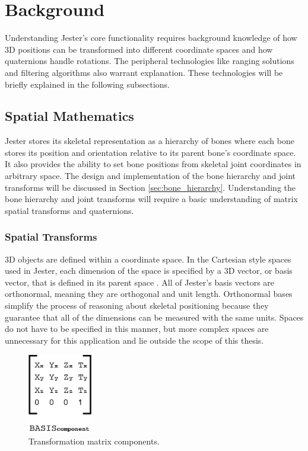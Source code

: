 \chapter{Background}

Understanding Jester's core functionality requires background knowledge of how 3D positions can be transformed into different coordinate spaces and how quaternions handle rotations. The peripheral technologies like ranging solutions and filtering algorithms also warrant explanation. These technologies will be briefly explained in the following subsections.

\section{Spatial Mathematics}

Jester stores its skeletal representation as a hierarchy of bones where each bone stores its position and orientation relative to its parent bone's coordinate space. It also provides the ability to set bone positions from skeletal joint coordinates in arbitrary space. The design and implementation of the bone hierarchy and joint transforms will be discussed in Section \ref{sec:bone_hierarchy}. Understanding the bone hierarchy and joint transforms will require a basic understanding of matrix spatial transforms and quaternions.

\subsection{Spatial Transforms}

3D objects are defined within a coordinate space. In the Cartesian style spaces used in Jester, each dimension of the space is specified by a 3D vector, or basis vector, that is defined in its parent space \cite{gortler2012foundations}. All of Jester's basis vectors are orthonormal, meaning they are orthogonal and unit length. Orthonormal bases simplify the process of reasoning about skeletal positioning because they guarantee that all of the dimensions can be measured with the same units. Spaces do not have to be specified in this manner, but more complex spaces are unnecessary for this application and lie outside the scope of this thesis. 

\begin{figure}[h]
\centering
\includegraphics[width=0.25\textwidth]{figures/transMatrix}
\caption{Transformation matrix components.}
\label{fig:transformation_mat}
\end{figure}


